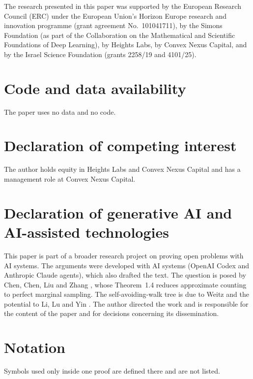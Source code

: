 \documentclass[11pt]{amsart}
\begin{document}
The research presented in this paper was supported by the European Research Council (ERC) under the European
Union's Horizon Europe research and innovation programme (grant agreement No.\ 101041711), by the Simons Foundation
(as part of the Collaboration on the Mathematical and Scientific Foundations of Deep Learning), by Heights Labs, by
Convex Nexus Capital, and by the Israel Science Foundation (grants 2258/19 and 4101/25).

\section*{Code and data availability}

The paper uses no data and no code.

\section*{Declaration of competing interest}

The author holds equity in Heights Labs and Convex Nexus Capital and has a management role at Convex Nexus Capital.

\section*{Declaration of generative AI and AI-assisted technologies}

This paper is part of a broader research project on proving open problems with AI systems. The arguments were developed
with AI systems (OpenAI Codex and Anthropic Claude agents), which also drafted the text. The question is posed by Chen,
Chen, Liu and Zhang \cite{CCLZ}, whose Theorem~1.4 reduces approximate counting to perfect marginal sampling. The
self-avoiding-walk tree is due to Weitz \cite{W06} and the potential to Li, Lu and Yin \cite{LLY}. The author directed
the work and is responsible for the content of the paper and for decisions concerning its dissemination.

\appendix
\section{Notation}

Symbols used only inside one proof are defined there and are not listed.
\end{document}

